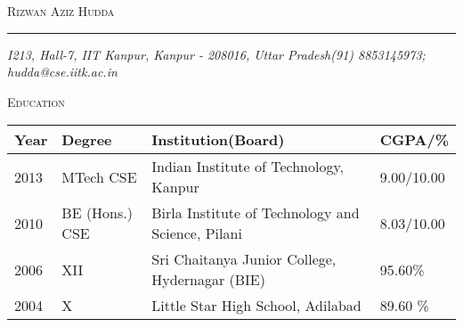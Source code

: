 \documentclass[10pt]{article}
\makeatletter
\newcommand{\name}{Rizwan Aziz Hudda}
\newcommand{\curaddr}{I213, Hall-7, IIT Kanpur, Kanpur - 208016, Uttar Pradesh}
\newcommand{\phone}{(91) 8853145973}
\newcommand{\email}{hudda@cse.iitk.ac.in}
\newcommand{\bigname}[1]{
	\begin{center}\fontfamily{phv}\selectfont\Huge\scshape#1\end{center}
}
\makeatother
\begin{document}
 \selectfont

\bigname{\name}

\vspace{-8pt} \rule{\textwidth}{1pt}

\vspace{-1pt} {\small\itshape \curaddr \hfill \phone; \email}

\vspace{8 pt}




{\selectfont\large\indent\textsc{Education}}
\vspace{0.5cm}
\setlength{\tabcolsep}{12pt}
\begin{center}
    \begin{tabular}{ | l | l | l | l |}
    \hline
    \textbf{Year} & \textbf{Degree} & \textbf{Institution(Board)} & \textbf{CGPA/\%} \\ \hline \hline
    2013 & MTech CSE & Indian Institute of Technology, Kanpur & 9.00/10.00 \\ \hline
    2010 & BE (Hons.) CSE & Birla Institute of Technology and Science, Pilani & 8.03/10.00 \\ \hline
    2006 & XII & Sri Chaitanya Junior College, Hydernagar (BIE) & 95.60\% \\ \hline
    2004 & X & Little Star High School, Adilabad & 89.60 \%  \\ \hline
    \end{tabular}
\end{center}

\end{document}
